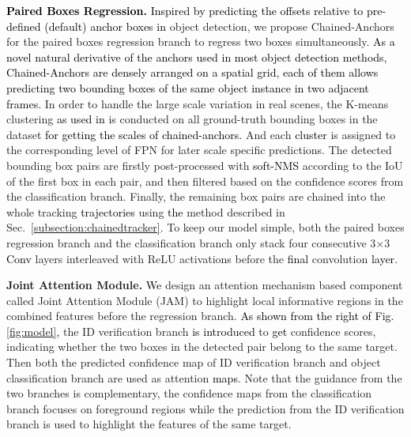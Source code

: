 \documentclass[../arXiv_main.tex]{subfiles}
\newcommand\wfb[1]{\textcolor{black}{#1}}
\newcommand\CRwca[1]{\textcolor{black}{#1}}
\newcommand\CRwfb[1]{\textcolor{black}{#1}}
\newcommand{\CRyang}[1]{\textcolor{black}{#1}}
\begin{document}
\noindent \textbf{\wfb{Paired Boxes Regression.}} \wfb{Inspired by} \CRwca{predicting the offsets relative to pre-defined (default) anchor boxes in} object detection, we propose Chained-Anchors for the paired boxes regression branch to regress two boxes simultaneously. \CRwca{As a novel natural derivative of the anchors used in most object detection methods, Chained-Anchors are densely arranged on a spatial grid, each of them allows predicting two bounding boxes of the same object instance in two adjacent frames.} In order to handle the large scale variation in real scenes, the K-means clustering \CRyang{as used in} \cite{yolov2} is conducted on all ground-truth bounding boxes in the dataset \CRyang{for getting the scales of chained-anchors.} And each \CRyang{cluster} is assigned to the corresponding level of FPN for later scale specific predictions. The detected bounding box pairs are firstly post-processed with \CRyang{soft-NMS} \cite{softnms} according to the IoU of the first box in each pair, and then filtered based on the confidence scores from the classification branch. Finally, the remaining box pairs are chained into the whole tracking \CRyang{trajectories} using \wfb{the} method described in Sec.~\ref{subsection:chainedtracker}. To keep our model simple, both the paired boxes regression branch and the classification branch only stack four consecutive 3$\times$3 \CRwfb{Conv} layers interleaved with ReLU activations before the \CRwfb{final} convolution \CRwfb{layer}.



\noindent \textbf{Joint Attention Module.} 
\CRyang{We} design an attention mechanism based component called Joint Attention Module (JAM) to highlight local informative regions in the combined features before the regression branch. \CRyang{As shown from the right of Fig. \ref{fig:model},} the ID verification branch \CRyang{is introduced} to \CRwfb{get} confidence scores, indicating whether the two boxes in the detected pair belong to the same target. Then both the predicted confidence map of ID verification branch and object classification branch are used as attention \CRyang{maps}. Note that the guidance from the two branches is complementary, the confidence maps from the classification branch focuses on foreground regions while the prediction from the ID verification branch is used to highlight the features of the same target. 
\end{document}
